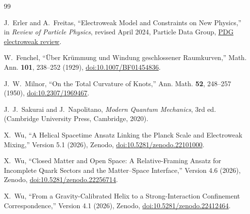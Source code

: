 \documentclass[10pt]{article}
\begin{document}
\begin{thebibliography}{99}
\small

J.~Erler and A.~Freitas,
``Electroweak Model and Constraints on New Physics,''
in \emph{Review of Particle Physics}, revised April 2024,
Particle Data Group,
\href{https://pdg.lbl.gov/2024/reviews/rpp2024-rev-standard-model.pdf}{PDG electroweak review}.

W.~Fenchel,
``\"Uber Kr\"ummung und Windung geschlossener Raumkurven,''
Math. Ann. \textbf{101}, 238--252 (1929),
\href{https://doi.org/10.1007/BF01454836}{doi:10.1007/BF01454836}.

J.~W.~Milnor,
``On the Total Curvature of Knots,''
Ann. Math. \textbf{52}, 248--257 (1950),
\href{https://doi.org/10.2307/1969467}{doi:10.2307/1969467}.

J.~J.~Sakurai and J.~Napolitano,
\emph{Modern Quantum Mechanics}, 3rd ed.
(Cambridge University Press, Cambridge, 2020).

X.~Wu,
``A Helical Spacetime Ansatz Linking the Planck Scale and Electroweak Mixing,''
Version 5.1 (2026), Zenodo,
\href{https://doi.org/10.5281/zenodo.22101000}{doi:10.5281/zenodo.22101000}.

X.~Wu,
``Closed Matter and Open Space: A Relative-Framing Ansatz for Incomplete Quark Sectors and the Matter--Space Interface,''
Version 4.6 (2026), Zenodo,
\href{https://doi.org/10.5281/zenodo.22256714}{doi:10.5281/zenodo.22256714}.

X.~Wu,
``From a Gravity-Calibrated Helix to a Strong-Interaction Confinement Correspondence,''
Version 4.1 (2026), Zenodo,
\href{https://doi.org/10.5281/zenodo.22412464}{doi:10.5281/zenodo.22412464}.

\end{thebibliography}
\end{document}
